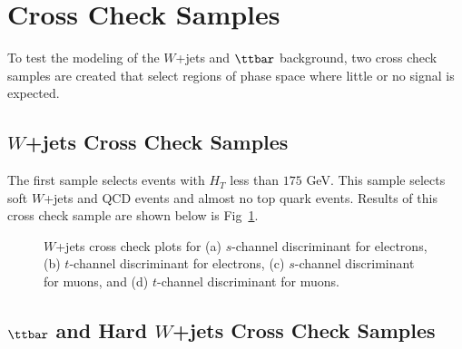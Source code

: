 \section{Cross Check Samples}

To test the modeling of the $W$+jets and $\ttbar$ background, two cross check
samples are created that select regions of phase space where little or no signal
is expected. 

\subsection{$W$+jets Cross Check Samples}

The first sample selects events with $H_{T}$ less than $175$
GeV. This sample selects soft $W$+jets and QCD events and almost no top quark
events. Results of this cross check sample are shown below is Fig~\ref{wjets_cross}.

\vspace{0.1in}
\begin{figure}[!h!tbp]
\begin{center}
\end{center}
\vspace{-0.1in}
\label{wjets_cross}
\caption{$W$+jets cross check plots for (a) $s$-channel discriminant for electrons,
(b) $t$-channel discriminant for electrons, (c) $s$-channel discriminant for muons,
and (d) $t$-channel discriminant for muons.}
\end{figure}

\clearpage
\subsection{$\ttbar$ and Hard $W$+jets Cross Check Samples}

